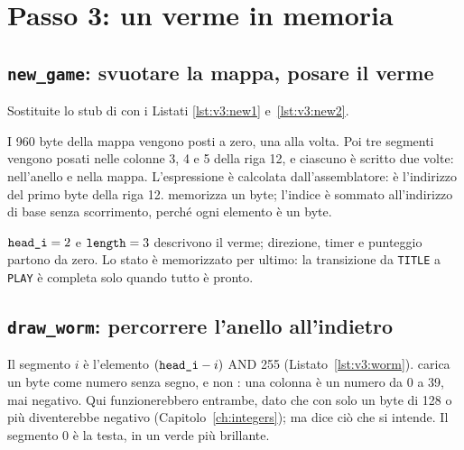 \section{Passo 3: un verme in memoria}

\subsection{\texttt{new\_game}: svuotare la mappa, posare il verme}

Sostituite lo stub di  con i Listati \ref{lst:v3:new1}
e~\ref{lst:v3:new2}.


I 960 byte della mappa vengono posti a zero, una  alla volta. Poi tre
segmenti vengono posati nelle colonne 3, 4 e 5 della riga 12, e ciascuno è
scritto due volte: nell'anello e nella mappa. L'espressione
 è calcolata dall'assemblatore: è l'indirizzo del primo byte
della riga 12.  memorizza un byte; l'indice è sommato all'indirizzo di
base senza scorrimento, perché ogni elemento è un byte.


$\texttt{head\_i}=2$ e $\texttt{length}=3$ descrivono il verme; direzione, timer e
punteggio partono da zero. Lo stato è memorizzato per ultimo: la transizione da
\texttt{TITLE} a \texttt{PLAY} è completa solo quando tutto è pronto.

\subsection{\texttt{draw\_worm}: percorrere l'anello all'indietro}


Il segmento $i$ è l'elemento $(\texttt{head\_i}-i)$ AND 255
(Listato~\ref{lst:v3:worm}).  carica un byte come numero senza segno,
e non : una colonna è un numero da 0 a 39, mai negativo. Qui
funzionerebbero entrambe, dato che con  solo un byte di 128 o più
diventerebbe negativo (Capitolo~\ref{ch:integers}); ma  dice ciò che
si intende. Il segmento 0 è la testa, in un verde più brillante.

